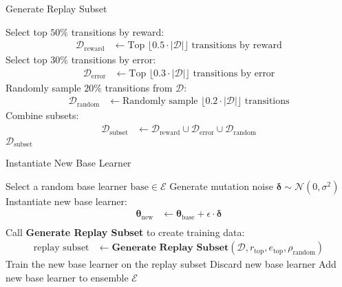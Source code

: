 \begin{algorithm}[H]
\caption{Generate Replay Subset}
\begin{algorithmic}[1]
\State Select top $50\%$ transitions by reward:
\begin{align*}
    \mathcal{D}_{\text{reward}} &\gets \text{Top } \lfloor 0.5 \cdot |\mathcal{D}| \rfloor \text{ transitions by reward}
\end{align*}
\State Select top $30\%$ transitions by error:
\begin{align*}
    \mathcal{D}_{\text{error}} &\gets \text{Top } \lfloor 0.3 \cdot |\mathcal{D}| \rfloor \text{ transitions by error}
\end{align*}
\State Randomly sample $20\%$ transitions from $\mathcal{D}$:
\begin{align*}
    \mathcal{D}_{\text{random}} &\gets \text{Randomly sample } \lfloor 0.2 \cdot |\mathcal{D}| \rfloor \text{ transitions}
\end{align*}
\State Combine subsets:
\begin{align*}
    \mathcal{D}_{\text{subset}} &\gets \mathcal{D}_{\text{reward}} \cup \mathcal{D}_{\text{error}} \cup \mathcal{D}_{\text{random}}
\end{align*}
\State \Return $\mathcal{D}_{\text{subset}}$
\end{algorithmic}
\end{algorithm}

\begin{algorithm}[H]
\caption{Instantiate New Base Learner}
\begin{algorithmic}[1]
\State Select a random base learner $\text{base} \in \mathcal{E}$
\State Generate mutation noise $\bm{\delta} \sim \mathcal{N}(0, \sigma^2)$
\State Instantiate new base learner:
\begin{align*}
    \bm{\theta}_{\text{new}} &\gets \bm{\theta}_{\text{base}} + \epsilon \cdot \bm{\delta} \\
\end{align*}
\State Call \textbf{Generate Replay Subset} to create training data:
\begin{align*}
    \text{replay subset} &\gets \textbf{Generate Replay Subset}(\mathcal{D}, r_{\text{top}}, e_{\text{top}}, \rho_{\text{random}})
\end{align*}
\State Train the new base learner on the replay subset
    \State Discard new base learner
\Else
    \State Add new base learner to ensemble $\mathcal{E}$
\EndIf
\end{algorithmic}
\end{algorithm}

